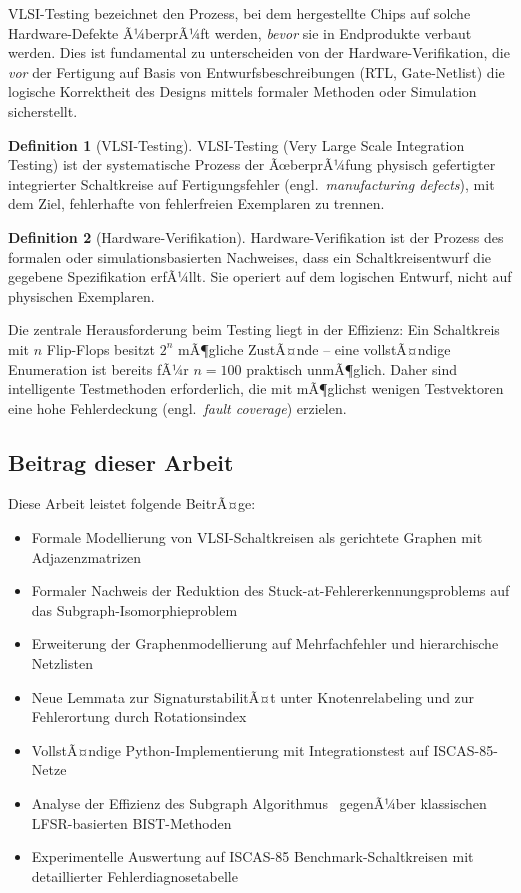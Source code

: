﻿\documentclass[a4paper,12pt]{article}
\theoremstyle{definition}
\newtheorem{definition}{Definition}
\begin{document}
VLSI-Testing bezeichnet den Prozess, bei dem hergestellte Chips auf solche
Hardware-Defekte Ã¼berprÃ¼ft werden, \emph{bevor} sie in Endprodukte verbaut
werden. Dies ist fundamental zu unterscheiden von der Hardware-Verifikation,
die \emph{vor} der Fertigung auf Basis von Entwurfs\-beschreibungen (RTL,
Gate-Netlist) die logische Korrektheit des Designs mittels formaler Methoden
oder Simulation sicherstellt.

\begin{definition}[VLSI-Testing]
  VLSI-Testing (Very Large Scale Integration Testing) ist der systematische
  Prozess der Ãœber\-prÃ¼fung physisch gefertigter integrierter Schaltkreise
  auf Fertigungs\-fehler (engl.\ \emph{manufacturing defects}), mit dem Ziel,
  fehlerhafte von fehlerfreien Exemplaren zu trennen.
\end{definition}

\begin{definition}[Hardware-Verifikation]
  Hardware-Verifikation ist der Prozess des formalen oder
  simulations\-basierten Nachweises, dass ein Schaltkreis\-entwurf die
  gegebene Spezifikation erfÃ¼llt. Sie operiert auf dem logischen Entwurf,
  nicht auf physischen Exemplaren.
\end{definition}

Die zentrale Herausforderung beim Testing liegt in der Effizienz: Ein
Schaltkreis mit $n$ Flip-Flops besitzt $2^n$ mÃ¶gliche ZustÃ¤nde -- eine
vollstÃ¤ndige Enumeration ist bereits fÃ¼r $n = 100$ praktisch unmÃ¶glich.
Daher sind intelligente Testmethoden erforderlich, die mit mÃ¶glichst wenigen
Testvektoren eine hohe Fehlerdeckung (engl.\ \emph{fault coverage}) erzielen.

\subsection{Beitrag dieser Arbeit}

Diese Arbeit leistet folgende BeitrÃ¤ge:

\begin{itemize}
  \item Formale Modellierung von VLSI-Schaltkreisen als gerichtete Graphen
        mit Adjazenz\-matrizen
  \item Formaler Nachweis der Reduktion des Stuck-at-Fehlererkennungs\-problems
        auf das Subgraph-Isomorphieproblem
  \item Erweiterung der Graphenmodellierung auf Mehrfachfehler und
        hierarchische Netzlisten
  \item Neue Lemmata zur SignaturstabilitÃ¤t unter Knotenrelabeling und zur
        Fehlerortung durch Rotationsindex
  \item VollstÃ¤ndige Python-Implementierung mit Integrations\-test auf
        ISCAS-85-Netze
  \item Analyse der Effizienz des Subgraph Algorithmus~\cite{epp2026subgraph}
        gegenÃ¼ber klassischen LFSR-basierten BIST-Methoden
  \item Experimentelle Auswertung auf ISCAS-85 Benchmark-Schaltkreisen
        \cite{brglez1985combinational} mit detaillierter Fehlerdiagnosetabelle
\end{itemize}
\end{document}
